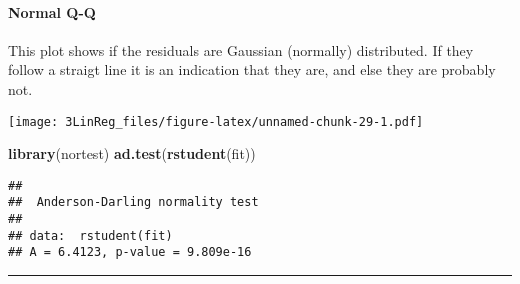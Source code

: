 \documentclass[]{article}
\newenvironment{Shaded}{\begin{snugshade}}{\end{snugshade}}
\newcommand{\DataTypeTok}[1]{\textcolor[rgb]{0.13,0.29,0.53}{#1}}
\newcommand{\DecValTok}[1]{\textcolor[rgb]{0.00,0.00,0.81}{#1}}
\newcommand{\KeywordTok}[1]{\textcolor[rgb]{0.13,0.29,0.53}{\textbf{#1}}}
\newcommand{\NormalTok}[1]{#1}
\newcommand{\OperatorTok}[1]{\textcolor[rgb]{0.81,0.36,0.00}{\textbf{#1}}}
\newcommand{\StringTok}[1]{\textcolor[rgb]{0.31,0.60,0.02}{#1}}
\let\oldparagraph\paragraph
\renewcommand{\paragraph}[1]{\oldparagraph{#1}\mbox{}}
\begin{document}
\hypertarget{normal-q-q}{%
\paragraph{Normal Q-Q}\label{normal-q-q}}

This plot shows if the residuals are Gaussian (normally) distributed. If
they follow a straigt line it is an indication that they are, and else
they are probably not.

\footnotesize

\begin{Shaded}
\end{Shaded}

\texttt{[image: 3LinReg\_files/figure-latex/unnamed-chunk-29-1.pdf]}

\begin{Shaded}
\begin{Highlighting}[]
\KeywordTok{library}\NormalTok{(nortest)}
\KeywordTok{ad.test}\NormalTok{(}\KeywordTok{rstudent}\NormalTok{(fit))}
\end{Highlighting}
\end{Shaded}

\begin{verbatim}
## 
##  Anderson-Darling normality test
## 
## data:  rstudent(fit)
## A = 6.4123, p-value = 9.809e-16
\end{verbatim}

\normalsize

\begin{center}\rule{0.5\linewidth}{\linethickness}\end{center}
\end{document}
